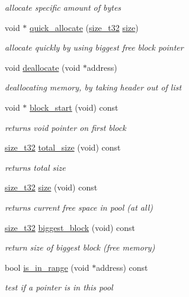 \begin{DoxyCompactItemize}
\begin{DoxyCompactList}\small\item\em allocate specific amount of bytes \end{DoxyCompactList}\item 
void $\ast$ \hyperlink{classcrap_1_1memory__pool_a2bae67eb417ac2106964fb158a3b8289}{quick\-\_\-allocate} (\hyperlink{types_8h_a38c0a12279ffe0fabec44939e753c914}{size\-\_\-t32} \hyperlink{classcrap_1_1memory__pool_adb17e01142872367d7451c4e9ce19cef}{size})
\begin{DoxyCompactList}\small\item\em allocate quickly by using biggest free block pointer \end{DoxyCompactList}\item 
void \hyperlink{classcrap_1_1memory__pool_a9535c7027e4bbd89bb763ab461080ac1}{deallocate} (void $\ast$address)
\begin{DoxyCompactList}\small\item\em deallocating memory, by taking header out of list \end{DoxyCompactList}\item 
void $\ast$ \hyperlink{classcrap_1_1memory__pool_a595f6e669ec14642431e7bd20b2a3b1d}{block\-\_\-start} (void) const 
\begin{DoxyCompactList}\small\item\em returns void pointer on first block \end{DoxyCompactList}\item 
\hyperlink{types_8h_a38c0a12279ffe0fabec44939e753c914}{size\-\_\-t32} \hyperlink{classcrap_1_1memory__pool_abc7e2a4dcba0c9207292a1778f157436}{total\-\_\-size} (void) const 
\begin{DoxyCompactList}\small\item\em returns total size \end{DoxyCompactList}\item 
\hyperlink{types_8h_a38c0a12279ffe0fabec44939e753c914}{size\-\_\-t32} \hyperlink{classcrap_1_1memory__pool_adb17e01142872367d7451c4e9ce19cef}{size} (void) const 
\begin{DoxyCompactList}\small\item\em returns current free space in pool (at all) \end{DoxyCompactList}\item 
\hyperlink{types_8h_a38c0a12279ffe0fabec44939e753c914}{size\-\_\-t32} \hyperlink{classcrap_1_1memory__pool_acaf9502477bb3130b92bab7f9cf4579f}{biggest\-\_\-block} (void) const 
\begin{DoxyCompactList}\small\item\em return size of biggest block (free memory) \end{DoxyCompactList}\item 
bool \hyperlink{classcrap_1_1memory__pool_ad01cbb03dc6aaed343e2160221a1266b}{is\-\_\-in\-\_\-range} (void $\ast$address) const 
\begin{DoxyCompactList}\small\item\em test if a pointer is in this pool \end{DoxyCompactList}\end{DoxyCompactItemize}


